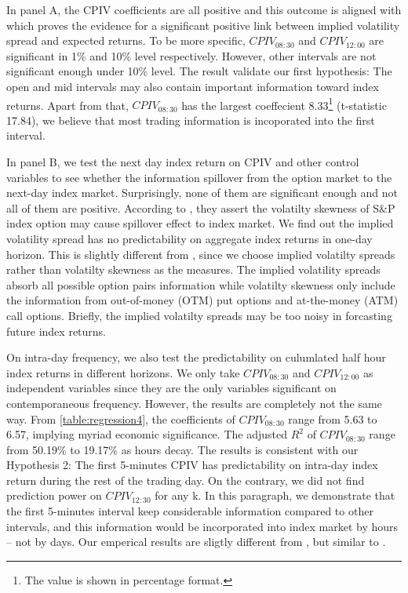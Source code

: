In panel A, the CPIV coefficients are all positive and this outcome is aligned with \textcite{cremers2010deviations} which proves the evidence for a significant positive link between implied volatility spread and expected returns. To be more specific, $CPIV_{08:30}$ and $CPIV_{12:00}$ are significant in 1\% and 10\% level respectively. However, other intervals are not significant enough under 10\% level. The result validate our first hypothesis: The open and mid intervals may also contain important information toward index returns. Apart from that, $CPIV_{08:30}$ has the largest coeffecient 8.33\footnote{The value is shown in percentage format.} (t-statistic 17.84), we believe that most trading information is incoporated into the first interval.

In panel B, we test the next day index return on CPIV and other control variables to see whether the information spillover from the option market to the next-day index market. Surprisingly, none of them are significant enough and not all of them are positive. According to \textcite{atilgan2015implied}, they assert the volatilty skewness of S\&P index option may cause spillover effect to index market. We find out the implied volatility spread has no predictability on aggregate index returns in one-day horizon. This is slightly different from \textcite{atilgan2015implied}, since we choose implied volatilty spreads rather than volatilty skewness as the measures. The implied volatility spreads absorb all possible option pairs information while volatilty skewness only include the information from out-of-money (OTM) put options and at-the-money (ATM) call options. Briefly, the implied volatilty spreads may be too noisy in forcasting future index returns.  

On intra-day frequency, we also test the predictability on culumlated half hour index returns in different horizons. We only take $CPIV_{08:30}$ and $CPIV_{12:00}$ as independent variables since they are the only variables significant on contemporaneous frequency. However, the results are completely not the same way. From \autoref{table:regression4}, the coefficients of $CPIV_{08:30}$ range from 5.63 to 6.57, implying myriad economic significance. The adjusted $R^{2}$ of $CPIV_{08:30}$ range from 50.19\% to 19.17\% as hours decay. The results is consistent with our Hypothesis 2: The first 5-minutes CPIV has predictability on intra-day index return during the rest of the trading day. On the contrary, we did not find prediction power on $CPIV_{12:30}$ for any k. In this paragraph, we demonstrate that the first 5-minutes interval keep considerable information compared to other intervals, and this information would be incorporated into index market by hours -- not by days. Our emperical results are sligtly different from \textcite{cremers2010deviations}, but similar to \textcite{kumar1992behavior}. 
   




